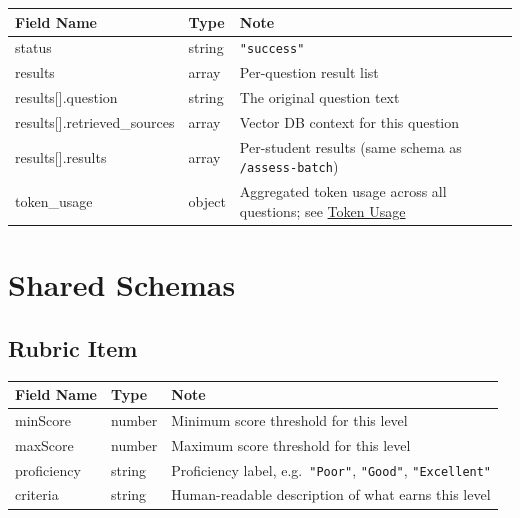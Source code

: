 \documentclass[11pt]{article}
\begin{document}
\begin{longtable}{|p{5cm}|p{2cm}|p{7.7cm}|}
  \hline
  \rowcolor{tabheader}
  \textbf{Field Name} & \textbf{Type} & \textbf{Note} \\
  \hline
  \endhead
  status                       & string & \texttt{"success"} \\
  \hline
  results                      & array  & Per-question result list \\
  \hline
  results[].question           & string & The original question text \\
  \hline
  results[].retrieved\_sources & array  & Vector DB context for this question \\
  \hline
  results[].results            & array  & Per-student results (same schema as \texttt{/assess-batch}) \\
  \hline
  token\_usage                 & object & Aggregated token usage across all questions; see \hyperref[sec:tokenusage]{Token Usage} \\
  \hline
\end{longtable}

\section{Shared Schemas}

\subsection{Rubric Item}
\label{sec:rubricitem}

\begin{longtable}{|p{3.5cm}|p{2cm}|p{9.2cm}|}
  \hline
  \rowcolor{tabheader}
  \textbf{Field Name} & \textbf{Type} & \textbf{Note} \\
  \hline
  \endhead
  minScore    & number & Minimum score threshold for this level \\
  \hline
  maxScore    & number & Maximum score threshold for this level \\
  \hline
  proficiency & string & Proficiency label, e.g.\ \texttt{"Poor"}, \texttt{"Good"}, \texttt{"Excellent"} \\
  \hline
  criteria    & string & Human-readable description of what earns this level \\
  \hline
\end{longtable}
\end{document}
